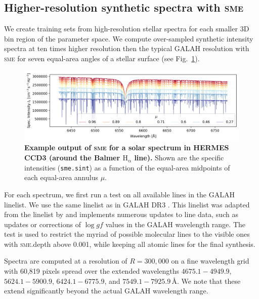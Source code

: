 \documentclass[
  journal=pasa,
  manuscript=research-paper, %
  year=2024,
  volume=37
]{cup-journal}
\newcommand{\sme}{\textsc{sme}\xspace}
\newcommand{\Angstroem}{\,\text{\AA}}	%
\begin{document}
\subsection{Higher-resolution synthetic spectra with \sme}
\label{sec:higher_resolution_synthetic_spectra}

We create training sets from high-resolution stellar spectra for each smaller 3D bin region of the parameter space. We compute over-sampled synthetic intensity spectra at ten times higher resolution then the typical GALAH resolution with \sme for seven equal-area angles of a stellar surface (see Fig.~\ref{fig:sme_mu_output}).

\begin{figure}[ht][hbt]
 \centering
 \includegraphics[width=\textwidth]{figures/solar_twin_specific_intensity.png}
 \caption{\textbf{Example output of \sme for a solar spectrum in HERMES CCD3 (around the Balmer $\mathrm{H}_\upalpha$ line).} Shown are the specific intensities (\texttt{sme.sint}) as a function of the equal-area midpoints of each equal-area annulus $\mu$.}
 \label{fig:sme_mu_output}
\end{figure}

For each spectrum, we first run a test on all available lines in the GALAH linelist. We use the same linelist as in GALAH DR3 \citep{Buder2021}. This linelist was adapted from the linelist by \citet{Heiter2021} and implements numerous updates to line data, such as updates or corrections of $\log gf$ values in the GALAH wavelength range. The test is used to restrict the myriad of possible molecular lines to the visible ones with \textsc{sme}.depth above 0.001, while keeping all atomic lines for the final synthesis.

Spectra are computed at a resolution of $R = 300,000$ on a fine wavelength grid with 60,819 pixels spread over the extended wavelengths $4675.1-4949.9$, $5624.1-5900.9$, $6424.1-6775.9$, and $7549.1-7925.9 \Angstroem$. We note that these extend significantly beyond the actual GALAH wavelength range.
\end{document}
